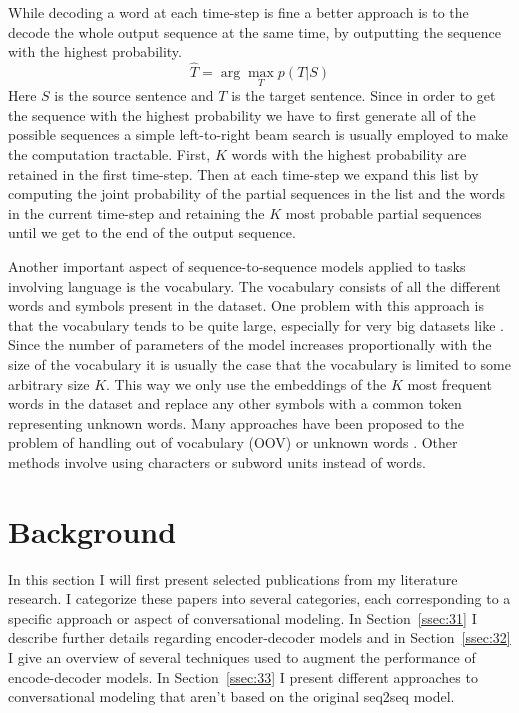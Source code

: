 \documentclass[12pt]{article}
\begin{document}
While decoding a word at each time-step is fine a better approach is to the decode the whole output sequence at the same time, by outputting the sequence with the highest probability.
\begin{equation} \label{eq233}
\hat{T}=\arg\max_{T}p(T|S)
\end{equation}
Here \(S\) is the source sentence and \(T\) is the target sentence. Since in order to get the sequence with the highest probability we have to first generate all of the possible sequences a simple left-to-right beam search is usually employed to make the computation tractable. First, \(K\) words with the highest probability are retained in the first time-step. Then at each time-step we expand this list by computing the joint probability of the partial sequences in the list and the words in the current time-step and retaining the \(K\) most probable partial sequences until we get to the end of the output sequence.

Another important aspect of sequence-to-sequence models applied to tasks involving language is the vocabulary. The vocabulary consists of all the different words and symbols present in the dataset. One problem with this approach is that the vocabulary tends to be quite large, especially for very big datasets like \cite{OpenSubtitles:2016,opensubtitles}. Since the number of parameters of the model increases proportionally with the size of the vocabulary it is usually the case that the vocabulary is limited to some arbitrary size \(K\). This way we only use the embeddings of the \(K\) most frequent words in the dataset and replace any other symbols with a common token representing unknown words. Many approaches have been proposed to the problem of handling out of vocabulary (OOV) or unknown words \cite{Luong:2014,Feng:2017,Jean:2014}. Other methods involve using characters \cite{Zhu:2017} or subword units \cite{Sennrich:2015} instead of words.

\newpage\section{Background} \label{sec:background}
In this section I will first present selected publications from my literature research. I categorize these papers into several categories, each corresponding to a specific approach or aspect of conversational modeling. In Section~\ref{ssec:31} I describe further details regarding encoder-decoder models and in Section~\ref{ssec:32} I give an overview of several techniques used to augment the performance of encode-decoder models. In Section~\ref{ssec:33} I present different approaches to conversational modeling that aren't based on the original seq2seq model.
\end{document}
